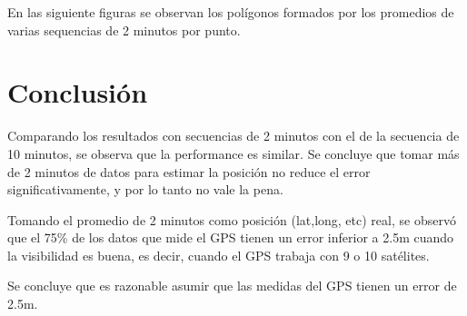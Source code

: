 \documentclass[spanish,12pt,a4paper,titlepage]{report}
\begin{document}
En las siguiente figuras se observan los polígonos formados por los promedios de varias sequencias de 2 minutos por punto. 

% 

\newpage
\section{Conclusión}
\label{sec:conclusion}

Comparando los resultados con secuencias de 2 minutos con el de la secuencia de 10 minutos, se observa que la performance es similar. Se concluye que tomar más de 2 minutos de datos para estimar la posición no reduce el error significativamente, y por lo tanto no vale la pena.

Tomando el promedio de 2 minutos como posición (lat,long, etc) real, se observó que el 75\% de los datos que mide el GPS tienen un error inferior a 2.5m cuando la visibilidad es buena, es decir, cuando el GPS trabaja con 9 o 10 satélites.

Se concluye que es razonable asumir que las medidas del GPS tienen un error de 2.5m.
\end{document}
